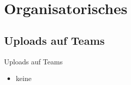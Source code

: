 %


\section{Organisatorisches}
\BlueSectionSlide

\subsection{Uploads auf Teams}
\begin{frame}{Uploads auf Teams}
	\begin{itemize}
		\item[\textbullet] keine
	\end{itemize}

\end{frame}



\folieFragen

